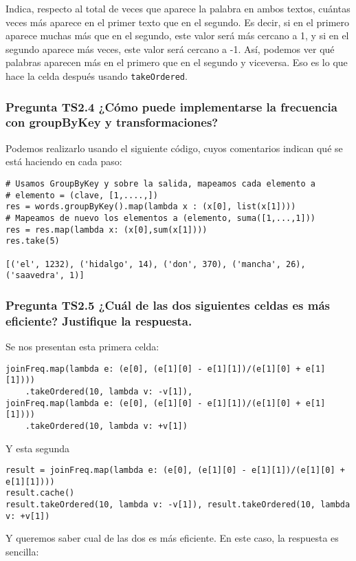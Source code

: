 \documentclass[11pt]{article}
\def\inline{\lstinline[basicstyle=\ttfamily,keywordstyle={}]}
\begin{document}
{{Indica, respecto al total de veces que aparece la palabra en ambos textos, cuántas veces más aparece en el primer texto que en el segundo. Es decir, si en el primero aparece muchas más que en el segundo, este valor será más cercano a 1, y si en el segundo aparece más veces, este valor será cercano a -1. Así, podemos ver qué palabras aparecen más en el primero que en el segundo y viceversa. Eso es lo que hace la celda después usando \inline{takeOrdered}.

\subsubsection*{Pregunta TS2.4 ¿Cómo puede implementarse la frecuencia con groupByKey y transformaciones? }

Podemos realizarlo usando el siguiente código, cuyos comentarios indican qué se está haciendo en cada paso:  

\begin{verbatim}
# Usamos GroupByKey y sobre la salida, mapeamos cada elemento a
# elemento = (clave, [1,....,])
res = words.groupByKey().map(lambda x : (x[0], list(x[1])))
# Mapeamos de nuevo los elementos a (elemento, suma([1,...,1]))
res = res.map(lambda x: (x[0],sum(x[1])))
res.take(5)

[('el', 1232), ('hidalgo', 14), ('don', 370), ('mancha', 26), ('saavedra', 1)]
\end{verbatim}


\subsubsection*{Pregunta TS2.5 ¿Cuál de las dos siguientes celdas es más eficiente? Justifique la respuesta.}

Se nos presentan esta primera celda: 
\begin{verbatim}
joinFreq.map(lambda e: (e[0], (e[1][0] - e[1][1])/(e[1][0] + e[1][1])))
    .takeOrdered(10, lambda v: -v[1]),
joinFreq.map(lambda e: (e[0], (e[1][0] - e[1][1])/(e[1][0] + e[1][1])))
    .takeOrdered(10, lambda v: +v[1])
\end{verbatim}
Y esta segunda
\begin{verbatim}
result = joinFreq.map(lambda e: (e[0], (e[1][0] - e[1][1])/(e[1][0] + e[1][1])))
result.cache()
result.takeOrdered(10, lambda v: -v[1]), result.takeOrdered(10, lambda v: +v[1])
\end{verbatim}
Y queremos saber cual de las dos es más eficiente. En este caso, la respuesta es sencilla: 

}}
\end{document}
